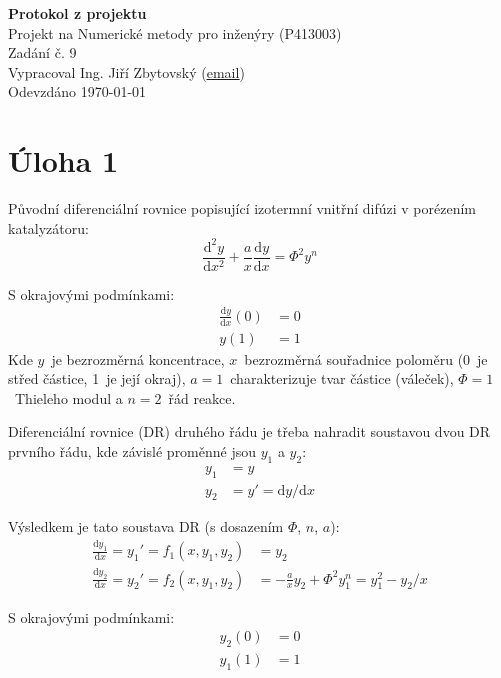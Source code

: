 \documentclass[a4paper,12pt]{article}
\begin{document}
\def\D{\mathrm{d}} %

\begin{center}
\LARGE\textbf{Protokol z projektu} \\
\vspace{2cm}
\large{
	Projekt na Numerické metody pro inženýry (P413003) \\
	Zadání č. 9 \\
	Vypracoval Ing. Jiří Zbytovský (\textcolor{blue}{\underline{\href{mailto:zbytovsi@vscht.cz}{email}}}) \\
	Odevzdáno \today
}
\end{center}



\newpage
\section*{Úloha 1}
Původní diferenciální rovnice popisující izotermní vnitřní difúzi v porézením katalyzátoru:
\begin{equation}
	\frac{\D^2 y}{\D x^2} + \frac{a}{x} \frac{\D y}{\D x} = \Phi^2 y^n
\end{equation}

S okrajovými podmínkami:
\begin{align}
	\frac{\D y}{\D x} (0) &= 0
	\\
	y(1) &= 1
\end{align}
Kde $y$~je bezrozměrná koncentrace, $x$~bezrozměrná souřadnice poloměru (0~je střed částice, 1~je její okraj), $a=1$~charakterizuje tvar částice (váleček), $\Phi=1$~Thieleho modul a $n=2$~řád reakce.

Diferenciální rovnice (DR) druhého řádu je třeba nahradit soustavou dvou DR prvního řádu, kde závislé proměnné jsou $y_1$ a $y_2$:
\begin{align}
	y_1 &= y
	\\
	y_2 &= y' = \D y / \D x
\end{align}

Výsledkem je tato soustava DR (s dosazením $\Phi$, $n$, $a$):
\begin{align}
	\frac{\D y_1}{\D x} = y_1' = f_1(x,y_1,y_2) &= y_2
	\\
	\frac{\D y_2}{\D x} = y_2' = f_2(x,y_1,y_2) &= -\frac{a}{x} y_2 + \Phi^2 y_1^n = y_1^2 - y_2 / x
\end{align}

S okrajovými podmínkami:
\begin{align}
	y_2(0) &= 0
	\\
	y_1(1) &= 1
\end{align}
\end{document}
